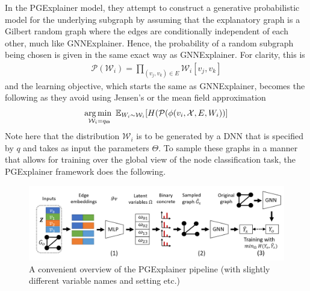 In the PGExplainer model, they attempt to construct a generative probabilistic model for the underlying subgraph by assuming that the explanatory graph is a Gilbert random graph \cite{gilbert_random_1959} where the edges are conditionally independent of each other, much like GNNExplainer. Hence, the probability of a random subgraph being chosen is given in the same exact way as GNNExplainer. For clarity, this is
\begin{align*}
	\mathcal{P}(\mathcal{W}_i) = \prod_{(v_j, v_k) \in E} \mathcal{W}_i[v_j, v_k]
\end{align*}
and the learning objective, which starts the same as GNNExplainer, becomes the following as they avoid using Jensen's or the mean field approximation
\begin{align*}
	\operatorname*{arg\,min\,\,}_{\mathcal{W}_i = q_{\Theta}} \mathbb{E}_{W_i \sim \mathcal{W}_i}[H(\mathcal{P}(\phi(v_i, \mathcal{X}, E, W_i))]
\end{align*}
Note here that the distribution $\mathcal{W}_i$ is to be generated by a DNN that is specified by $q$ and takes as input the parameters $\Theta$. To sample these graphs in a manner that allows for training over the global view of the node classification task, the PGExplainer framework does the following.
\begin{figure}[t]
	\centering
	\includegraphics[width=\textwidth]{images/pgexp.png}
	\caption{A convenient overview of the PGExplainer pipeline (with slightly different variable names and setting etc.) \cite{luo_parameterized_2020}}
	\label{fig:pgexp}
\end{figure}
